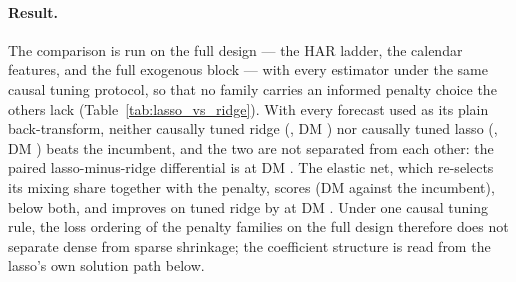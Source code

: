 \paragraph{Result.}
The comparison is run on the full design --- the HAR ladder, the calendar
features, and the full exogenous block --- with every estimator under the
same causal tuning protocol, so that no family carries an informed
penalty choice the others lack
(Table~\ref{tab:lasso_vs_ridge}).
With every forecast used as its plain back-transform, neither causally
tuned ridge (\unifBOneRidgeTunedFineQLIKE{}, DM
\unifBOneRidgeTunedFineDM{}) nor causally tuned lasso
(\unifBTwoLassoTunedQLIKE{}, DM \unifBTwoLassoTunedDM{}) beats the
incumbent, and the two are not separated from each other: the paired
lasso-minus-ridge differential is \unifIncrBTwoLassoTunedDQ{} at DM
\unifIncrBTwoLassoTunedDM{}. The elastic net, which re-selects its mixing
share together with the penalty, scores \unifBThreeEnetTunedQLIKE{} (DM
\unifBThreeEnetTunedDM{} against the incumbent), below both, and improves
on tuned ridge by \unifIncrBThreeEnetTunedDQ{} at DM
\unifIncrBThreeEnetTunedDM{}. Under one causal tuning rule, the loss
ordering of the penalty families on the full design therefore does not
separate dense from sparse shrinkage; the coefficient structure is read
from the lasso's own solution path below.

